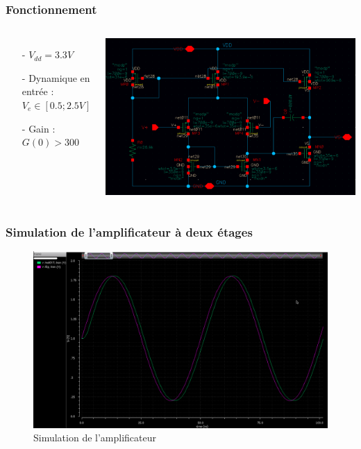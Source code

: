 \documentclass{beamer}
\begin{document}
\begin{frame}
\frametitle{Fonctionnement}

\begin{columns}[T]
  \begin{itemize}
    \item[-] $V_{dd} = 3.3 V$
    \item[-] Dynamique en entr\'ee : $V_e \in [0.5; 2.5V]$
    \item[-] Gain : $G(0) > 300$
  \end{itemize}

  \hspace*{-0.5cm}
  \includegraphics[width=\linewidth]{amplificateur_.png}
\end{columns}

\end{frame}


\begin{frame}
\frametitle{Simulation de l'amplificateur \`a deux \'etages}

\begin{figure}[!htb]
  \includegraphics[width=0.8\linewidth]{reponse_ampli.png}
  \caption{Simulation de l'amplificateur}
\end{figure}

\end{frame}
\end{document}
